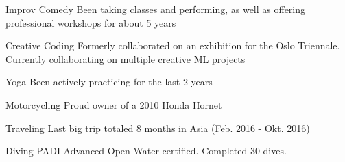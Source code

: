 


\begin{cvskills}


\cvskill
{Improv Comedy} %
{Been taking classes and performing, as well as offering professional workshops for about 5 years}


\cvskill
{Creative Coding} %
{Formerly collaborated on an exhibition for the Oslo Triennale. Currently collaborating on multiple creative ML projects} %


\cvskill
{Yoga} %
{Been actively practicing for the last 2 years} %


\cvskill
{Motorcycling} %
{Proud owner of a 2010 Honda Hornet} %


\cvskill
{Traveling} %
{Last big trip totaled 8 months in Asia (Feb. 2016 - Okt. 2016)} %


\cvskill
{Diving} %
{PADI Advanced Open Water certified. Completed 30 dives.} %


\end{cvskills}

